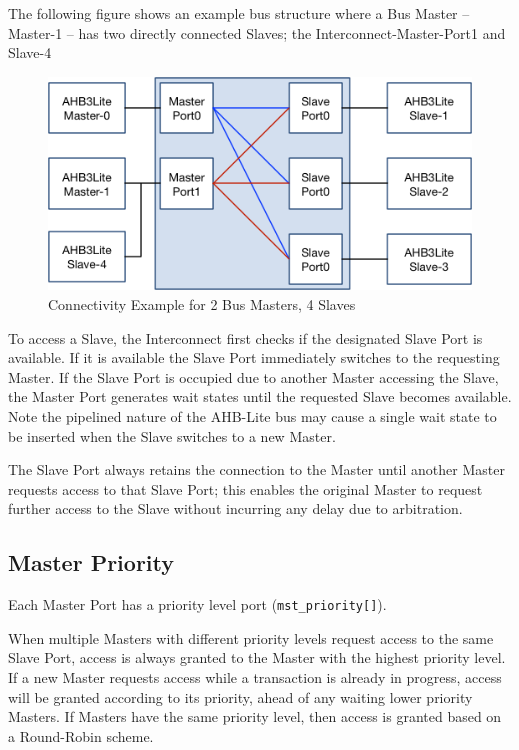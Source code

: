 The following figure shows an example bus structure where a Bus Master -- Master-1
-- has two directly connected Slaves; the Interconnect-Master-Port1 and
Slave-4

\begin{figure}[tbh]
	\includegraphics{assets/img/ahb-lite-switch-sys2.png}
	\caption{Connectivity Example for 2 Bus Masters, 4 Slaves}
	\label{fig:ahb-lite-switch-sys2}
\end{figure}

To access a Slave, the Interconnect first checks if the designated Slave
Port is available. If it is available the Slave Port immediately
switches to the requesting Master. If the Slave Port is occupied due to
another Master accessing the Slave, the Master Port generates wait
states until the requested Slave becomes available. Note the pipelined
nature of the AHB-Lite bus may cause a single wait state to be inserted
when the Slave switches to a new Master.

The Slave Port always retains the connection to the Master until another
Master requests access to that Slave Port; this enables the original
Master to request further access to the Slave without incurring any
delay due to arbitration.

\subsection{Master Priority}\label{master-priority}

Each Master Port has a priority level port (\texttt{mst\_priority[]}).

When multiple Masters with different priority levels request access to
the same Slave Port, access is always granted to the Master with the
highest priority level. If a new Master requests access while a
transaction is already in progress, access will be granted according to
its priority, ahead of any waiting lower priority Masters. If Masters
have the same priority level, then access is granted based on a
Round-Robin scheme.

